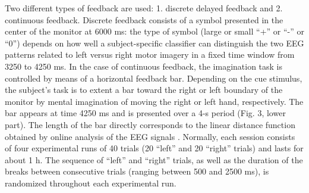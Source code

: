 \documentclass[journal,twocolumn]{IEEEtran}
\begin{document}
Two different types of feedback are used: 1. discrete delayed feedback and 2. continuous feedback. Discrete feedback consists of a symbol presented in the center of the monitor at 6000 ms: the type of symbol (large or small “+” or “-” or “0”) depends on how well a subject-specific classifier can distinguish the two EEG patterns related to left versus right motor imagery in a fixed time window from 3250 to 4250 ms. In the case of continuous feedback, the imagination task is controlled by means of a horizontal feedback bar. Depending on the cue stimulus, the subject’s task is to extent a bar toward the right or left boundary of the monitor by mental imagination of moving the right or left hand, respectively. The bar appears at time 4250 ms and is presented over a 4-s period (Fig. 3, lower part). The length of the bar directly corresponds to the linear distance function obtained by online analysis of the EEG signals \cite{neuper1999enhancement}. Normally, each session consists of four experimental runs of 40 trials (20 “left” and 20 “right” trials) and lasts for about 1 h. The sequence of “left” and “right” trials, as well as the duration of the breaks between consecutive trials (ranging between 500 and 2500 ms), is randomized throughout each experimental run.

\end{document}
